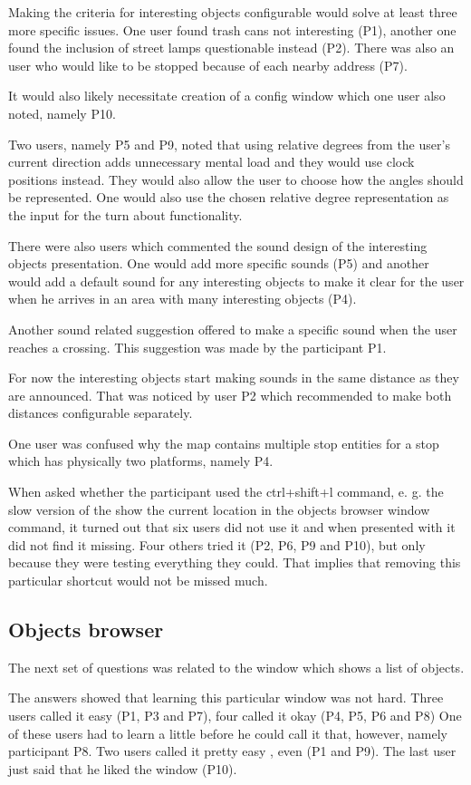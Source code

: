 \documentclass[nolof,digital]{fithesis3}
\begin{document}
Making the criteria for interesting objects configurable would solve at least three more specific issues. One user found trash cans not interesting (P1), another one found the inclusion of street lamps questionable instead (P2). There was also an user who would like to be stopped because of each nearby address (P7).

It would also likely necessitate creation of a config window which one user also noted, namely P10.

Two users, namely  P5 and P9, noted that using relative degrees from the user's current direction adds unnecessary mental load and they would use clock positions instead. They would also allow the user to choose how the angles should be represented. One would also use the chosen relative degree representation as the input for the turn about functionality.

There were also users which commented the sound design of the interesting objects presentation. One would add more specific sounds (P5) and another would add a default sound for any interesting objects to make it clear for the user when he arrives in an area with many interesting objects (P4).

Another sound related suggestion offered to make a specific sound when the user reaches a crossing. This suggestion was made by the participant P1.

For now the interesting objects start making sounds in the same distance as they are announced. That was noticed by user P2 which recommended to make both distances configurable separately.

One  user was confused why the map contains multiple stop entities for a stop which has physically two platforms, namely P4.

When asked whether the participant used the ctrl+shift+l command, e. g. the slow version of the show the current location in the objects browser window command, it turned out that six users did not use it and when presented with it did not find it missing. Four others tried it (P2, P6, P9 and P10), but only because they were testing everything they could. That implies that removing this particular shortcut would not be missed much.
\subsection{Objects browser}
The next set of questions was related to the window which shows a list of objects.

The answers showed that learning this particular window was not hard. Three users called it easy (P1, P3 and P7), four called it okay (P4, P5, P6 and P8) One of these users had to learn a little before he could call it that, however, namely participant P8. Two users called it pretty easy , even (P1 and P9). The last user just said that he liked the window (P10).
\end{document}
